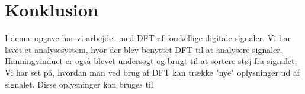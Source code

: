 \chapter{Konklusion}\label{ch:konclusion}
I denne opgave har vi arbejdet med DFT af forskellige digitale signaler. Vi har lavet et analysesystem, hvor der blev benyttet DFT til at analysere signaler. \\ Hanningvinduet er også blevet undersøgt og brugt til at sortere støj fra signalet.\\
Vi har set på, hvordan man ved brug af DFT kan trække "nye" oplysninger ud af signalet. Disse oplysninger kan bruges til